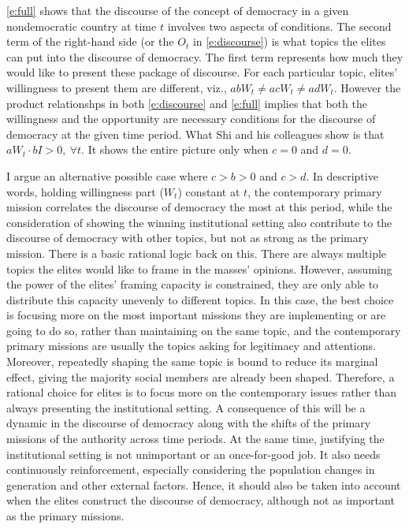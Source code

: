 \documentclass[abstracton,UTF8]{ctexart}
\begin{document}
\cref{e:full} shows that the discourse of the concept of democracy in a given nondemocratic country at time $t$ involves two aspects of conditions. The second term of the right-hand side (or the $O_t$ in \cref{e:discourse}) is what topics the elites can put into the discourse of democracy. The first term represents how much they would like to present these package of discourse. For each particular topic, elites' willingness to present them are different, viz., $abW_t \neq acW_t \neq adW_t$. However the product relationshps in both \cref{e:discourse} and \cref{e:full} implies that both the willingness and the opportunity are necessary conditions for the discourse of democracy at the given time period. What Shi and his colleagues show is that $aW_t\cdot bI > 0,\ \forall t.$ It shows the entire picture only when $c = 0$ and $d = 0$.

I argue an alternative possible case where $c > b > 0$ and $c > d$. In descriptive words, holding willingness part ($W_t$) constant at $t$, the contemporary primary mission correlates the discourse of democracy the most at this period, while the consideration of showing the winning institutional setting also contribute to the discourse of democracy with other topics, but not as strong as the primary mission. There is a basic rational logic back on this. There are always multiple topics the elites would like to frame in the masses' opinions. However, assuming the power of the elites' framing capacity is constrained, they are only able to distribute this capacity unevenly to different topics. In this case, the best choice is focusing more on the most important missions they are implementing or are going to do so, rather than maintaining on the same topic, and the contemporary primary missions are usually the topics asking for legitimacy and attentions. Moreover, repeatedly shaping the same topic is bound to reduce its marginal effect, giving the majority social members are already been shaped. Therefore, a rational choice for elites is to focus more on the contemporary issues rather than always presenting the institutional setting. A consequence of this will be a dynamic in the discourse of democracy along with the shifts of the primary missions of the authority across time periods. At the same time, justifying the institutional setting is not unimportant or an once-for-good job. It also needs continuously reinforcement, especially considering the population changes in generation and other external factors. Hence, it should also be taken into account when the elites construct the discourse of democracy, although not as important as the primary missions.
\end{document}
